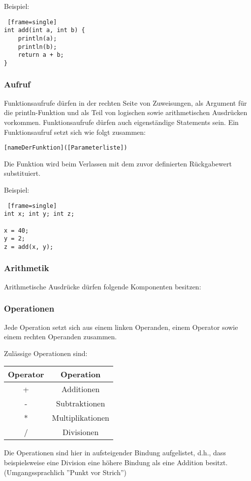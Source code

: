 Beispiel:
\begin{lstlisting} [frame=single] 
int add(int a, int b) {
	println(a);
	println(b);
	return a + b;
}
\end{lstlisting}

\subsubsection{Aufruf}
Funktionsaufrufe dürfen in der rechten Seite von Zuweisungen, als Argument für die println-Funktion und als Teil von logischen sowie arithmetischen Ausdrücken vorkommen. Funktionsaufrufe dürfen auch eigenständige Statements sein. Ein Funktionsaufruf setzt sich wie folgt zusammen:

\verb|[nameDerFunktion]([Parameterliste])|

Die Funktion wird beim Verlassen mit dem zuvor definierten Rückgabewert substituiert.

Beispiel:
\begin{lstlisting} [frame=single] 
int x; int y; int z;

x = 40;
y = 2;
z = add(x, y);
\end{lstlisting}

\subsubsection{Arithmetik}
Arithmetische Ausdrücke dürfen folgende Komponenten besitzen:

\subsubsection{Operationen}
Jede Operation setzt sich aus einem linken Operanden, einem Operator sowie einem rechten Operanden zusammen.

Zulässige Operationen sind:
\begin{center}
  \begin{tabular}{ | c | c | }
    \hline
    Operator & Operation\\ \hline \hline
    + & Additionen\\ \hline
    - & Subtraktionen\\ \hline
    * & Multiplikationen\\ \hline
    / & Divisionen\\ \hline
  \end{tabular}
\end{center}
Die Operationen sind hier in aufsteigender Bindung aufgelistet, d.h., dass beispielsweise eine Division eine höhere Bindung als eine Addition besitzt. (Umgangssprachlich ''Punkt vor Strich'')

